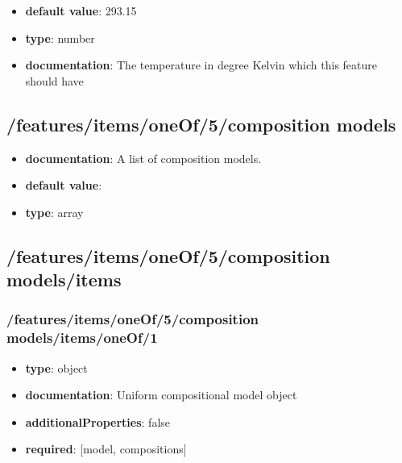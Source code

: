\begin{itemize}\item {\bf default value}: 293.15
\item {\bf type}: number
\item {\bf documentation}: The temperature in degree Kelvin which this feature should have
\end{itemize}\subsection{/features/items/oneOf/5/composition models}
\begin{itemize}\item {\bf documentation}: A list of composition models.
\item {\bf default value}: 
\item {\bf type}: array
\end{itemize}\subsection{/features/items/oneOf/5/composition models/items}

\subsubsection{/features/items/oneOf/5/composition models/items/oneOf/1}
\begin{itemize}\item {\bf type}: object
\item {\bf documentation}: Uniform compositional model object
\item {\bf additionalProperties}: false
\item {\bf required}: [model, compositions]\end{itemize}
